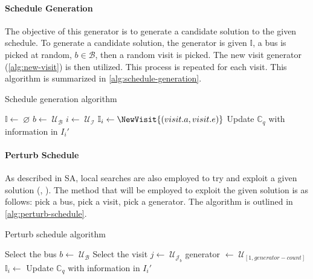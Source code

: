 \documentclass[11pt,a4paper,final]{article}
\newcommand{\I}{\mathbb{I}}                 %
\newcommand{\C}{\mathbb{C}}                 %
\newcommand{\U}{\mathcal{U}}                %
\newcommand{\Iset}{\mathcal{I}}             %
\newcommand{\Bset}{\mathcal{B}}             %
\newcommand{\Jset}{\mathcal{J}}             %
\begin{document}
\paragraph{Schedule Generation}
\label{schedule-generation}
The objective of this generator is to generate a candidate solution to the given schedule. To generate a candidate
solution, the generator is given \(\I\), a bus is picked at random, \(b \in \Bset\), then a random visit is picked. The new
visit generator (\ref{alg:new-visit}) is then utilized. This process is repeated for each visit. This algorithm is summarized
in \ref{alg:schedule-generation}.

\begin{algorithm}[H]
\caption{Schedule generation algorithm}
    \LinesNumbered
    \KwIn{$\I$, $\C$}
    \KwOut{$\I_i'$}


    \Begin
    {
        $\I \leftarrow \; \varnothing$\;
        {
            $b \leftarrow\; \U_{\Bset}$\;
            $i\leftarrow\; \U_{\Iset}$\;
            $\I_i \leftarrow \NewVisit{(visit.a, visit.e)}$\;
            Update $\C_q$ with information in $I_i'$\;
        }
            \Return{$\I$}
    }
\label{alg:schedule-generation}
\end{algorithm}

\paragraph{Perturb Schedule}
\label{tweak-schedule}
As described in SA, local searches are also employed to try and exploit a given solution
(, ). The method that will be employed to exploit the given solution is as follows: pick
a bus, pick a visit, pick a generator. The algorithm is outlined in \ref{alg:perturb-schedule}.

\begin{algorithm}[H]
\caption{Perturb schedule algorithm}

    \LinesNumbered
    \KwIn{$\I$, $\C$}
    \KwOut{$\I_i'$}


    \Begin
    {
        Select the bus $b \leftarrow\; \U_{\Bset}$\;
        Select the visit $j \leftarrow\; \U_{\Jset_b}$\;
        generator $\leftarrow\; \U_{[1,generator-count]}$\;
        $\I_i \leftarrow$ \GeneratorCallback[generator]{($j, \I, \C$)}\;
        Update $\C_q$ with information in $I_i'$\;
        \Return{$\I_i$}
    }
\label{alg:perturb-schedule}
\end{algorithm}
\end{document}
